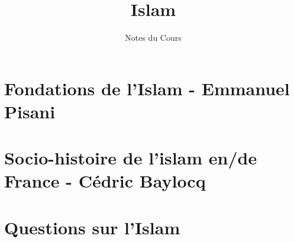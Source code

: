 \documentclass[oneside,10pt]{book} %
\title{Islam}
\author{Notes du Cours}
\begin{document}


\maketitle



\setcounter{page}{1}
\begin{fullwidth}
\tableofcontents
\end{fullwidth}

\setcounter{page}{1}

\mainmatter

%
\part{Fondations de l'Islam - Emmanuel Pisani}

\FloatBarrier






\part{Socio-histoire de l’islam en/de France - Cédric Baylocq}








\part{Questions sur l'Islam}






\backmatter

%
%
\printbibliography

\listoftheorems[ignoreall,show={Def}]

\end{document}
